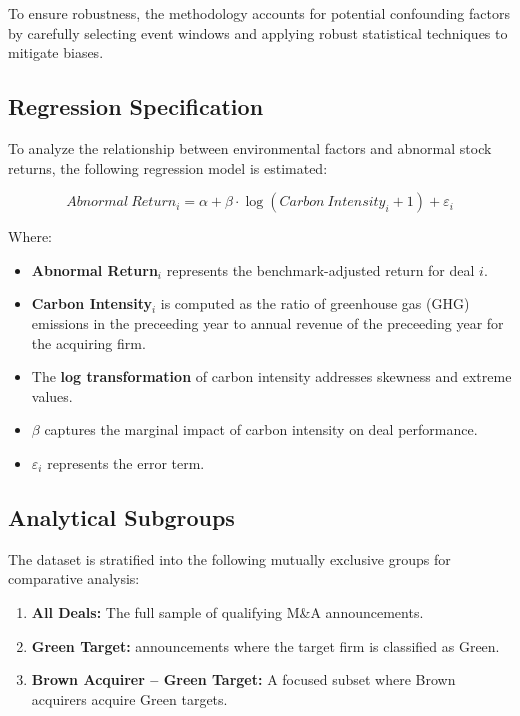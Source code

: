 \documentclass[a4paper]{article}
\begin{document}
To ensure robustness, the methodology accounts for potential confounding factors by carefully selecting event windows and applying robust statistical techniques to mitigate biases.

\subsection{Regression Specification}

To analyze the relationship between environmental factors and abnormal stock returns, the following regression model is estimated:

\begin{equation}
\label{eq:regression}
Abnormal\ Return_i = \alpha + \beta \cdot \log(Carbon\ Intensity_i + 1) + \varepsilon_i
\end{equation}

Where:
\begin{itemize}
    \setlength{\itemsep}{0pt} 
    \item \textbf{Abnormal Return\(_i\)} represents the benchmark-adjusted return for deal \(i\).
    \item \textbf{Carbon Intensity\(_i\)} is computed as the ratio of greenhouse gas (GHG) emissions in the preceeding year to annual revenue of the preceeding year for the acquiring firm.
    \item The \textbf{log transformation} of carbon intensity addresses skewness and extreme values.
    \item \(\beta\) captures the marginal impact of carbon intensity on deal performance.
    \item \(\varepsilon_i\) represents the error term.
\end{itemize}

\subsection{Analytical Subgroups}

The dataset is stratified into the following mutually exclusive groups for comparative analysis:

\begin{enumerate}
    \setlength{\itemsep}{0pt}
    \item \textbf{All Deals:} The full sample of qualifying M\&A announcements.
    \item \textbf{Green Target:} announcements where the target firm is classified as Green.
    \item \textbf{Brown Acquirer – Green Target:} A focused subset where Brown acquirers acquire Green targets.
\end{enumerate}
\end{document}
